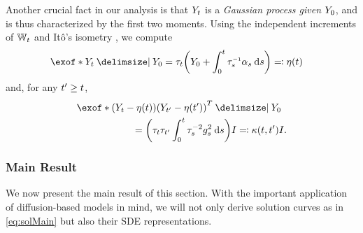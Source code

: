 Another crucial fact in our analysis is that $\refsde$ is a \emph{Gaussian process given $\refsde[0]$}, and is thus characterized by the first two moments. Using the independent increments of $\Wiener$ and It\^o's isometry \citep{protter2005stochastic}, we compute
\begin{align}
\label{eq:mYdef}
\exof*{  \refsde \given \refsde[0]  } &= \aggtime  \parens*{\refsde[0] +  \int_0^\ctime {\aggtimeinv[\ctimealt]}{ \shift[\ctimealt] } \dd \ctimealt  } \eqdef \mYcinit  
\end{align}and, for any $\ctime' \geq \ctime$, 
\begin{align}
\label{eq:covYdef}
&\exof*{  \parens*{ \refsde - \mYcinit  } \parens*{ \refsde[\ctime']- \mYcinit[\ctime']   }^T  \given \refsde[0] } \\
&\hspace{20mm}= \parens*{\aggtime \aggtime[\ctime'] \intdasq} \eye \eqdef \kernel \eye.
\nn
\end{align}


\subsubsection{Main Result}
\label{sec:GaussianSB-main}

We now present the main result of this section. With the important application of diffusion-based models in mind, we will not only derive solution curves as in \eqref{eq:solMain} but also their \acrshort{SDE} representations.

